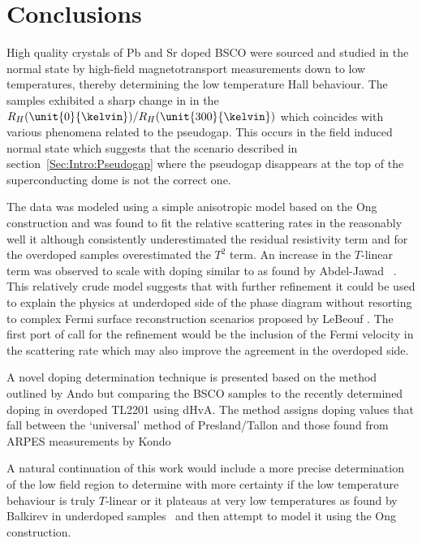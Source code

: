 
\section{Conclusions}

High quality crystals of Pb and Sr doped \ac{BSCO} were sourced and studied in the normal state by high-field magnetotransport measurements down to low temperatures, thereby determining the low temperature Hall behaviour. The samples exhibited a sharp change in in the $R_H(\unit{0}{\kelvin})/R_H(\unit{300}{\kelvin})$ which coincides with various phenomena related to the pseudogap. This occurs in the field induced normal state which suggests that the scenario described in section~\ref{Sec:Intro:Pseudogap} where the pseudogap disappears at the top of the superconducting dome is not the correct one.

The data was modeled using a simple anisotropic model based on the Ong construction and was found to fit the relative scattering rates in the reasonably well it although consistently underestimated the residual resistivity term and for the overdoped samples overestimated the $T^2$ term. An increase in the $T$-linear term was observed to scale with doping similar to as found by Abdel-Jawad \etal~\cite{Abdel-Jawad2007}. This relatively crude model suggests that with further refinement it could be used to explain the physics at underdoped side of the phase diagram without resorting to complex Fermi surface reconstruction scenarios proposed by LeBeouf \etal. The first port of call for the refinement would be the inclusion of the Fermi velocity in the scattering rate which may also improve the agreement in the overdoped side.

A novel doping determination technique is presented based on the method outlined by Ando \etal but comparing the \ac{BSCO} samples to the recently determined doping in overdoped \ac{TL2201} using \ac{dHvA}. The method assigns doping values that fall between the `universal' method of Presland/Tallon and those found from \ac{ARPES} measurements by Kondo \etal

A natural continuation of this work would include a more precise determination of the low field region to determine with more certainty if the low temperature behaviour is truly $T$-linear or it plateaus at very low temperatures as found by Balkirev \etal in underdoped samples~\cite{Balakirev2003} and then attempt to model it using the Ong construction.

